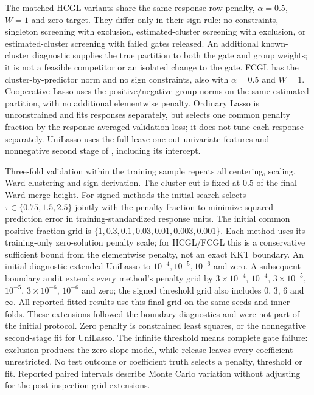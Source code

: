\documentclass[11pt,a4paper]{article}
\begin{document}
The matched HCGL variants share the same response-row penalty, $\alpha=0.5$,
$W=1$ and zero target. They differ only in their sign rule: no constraints,
singleton screening with exclusion, estimated-cluster screening with
exclusion, or estimated-cluster screening with failed gates released.
An additional known-cluster diagnostic supplies the true partition to both
the gate and group weights; it is not a feasible competitor or an isolated
change to the gate. FCGL has the cluster-by-predictor norm and no sign
constraints, also with $\alpha=0.5$ and $W=1$. Cooperative Lasso uses the
positive/negative group norms on the same estimated partition, with no
additional elementwise penalty. Ordinary Lasso is unconstrained and fits
responses separately, but selects one common penalty fraction by the
response-averaged validation loss; it does not tune each response separately.
UniLasso uses
the full leave-one-out univariate features and nonnegative second stage
of \citet{Chatterjee+Hastie+Tibshirani:2025}, including its intercept.

Three-fold validation within the training sample repeats all centering,
scaling, Ward clustering and sign derivation. The cluster cut is fixed at
$0.5$ of the final Ward merge height. For signed methods the initial search selects
$\tau\in\{0.75,1.5,2.5\}$ jointly with the penalty fraction to minimize
squared prediction error in training-standardized response units.
The initial common positive fraction grid is
$\{1,0.3,0.1,0.03,0.01,0.003,0.001\}$. Each method uses its training-only
zero-solution penalty scale; for HCGL/FCGL this is a conservative sufficient
bound from the elementwise penalty, not an exact KKT boundary.
An initial diagnostic extended UniLasso to $10^{-4},10^{-5},10^{-6}$ and zero.
A subsequent boundary audit extends every method's penalty grid by
$3\times10^{-4}$, $10^{-4}$, $3\times10^{-5}$, $10^{-5}$,
$3\times10^{-6}$, $10^{-6}$ and zero; the signed threshold grid also includes
$0$, $3$, $6$ and $\infty$. All reported fitted results use this final grid on
the same seeds and inner folds. These extensions followed the boundary
diagnostics and were not part of the initial protocol. Zero penalty is
constrained least squares, or the nonnegative second-stage fit for UniLasso.
The infinite threshold means complete gate failure: exclusion produces the
zero-slope model, while release leaves every coefficient unrestricted.
No test outcome or coefficient truth selects a penalty, threshold or fit.
Reported paired intervals describe Monte Carlo variation without adjusting for
the post-inspection grid extensions.
\end{document}
